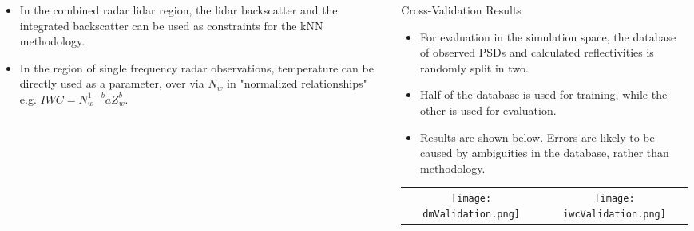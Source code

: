 \documentclass[final,t]{beamer}
\begin{document}
\begin{frame}
\begin{columns}[]
\begin{column}{.32\linewidth}
\begin{itemize}
\item
In the combined radar lidar region, the lidar backscatter and the integrated backscatter can be used
as constraints for the kNN methodology.
\item
In the region of single frequency radar observations, temperature can be directly used as a parameter,
over via $N_w$ in "normalized relationships" e.g. $IWC=N_w^{1-b}aZ_w^b$.
\end{itemize}
\end{column}




  \begin{column}{.32\linewidth}

  \begin{block}{Cross-Validation Results}
  \begin{itemize}
   \item
   For evaluation in the simulation space, the database of observed PSDs and calculated reflectivities is randomly split in two.
   \item
   Half of the database is used for training, while the other is used for evaluation.
   \item
   Results are shown below.  Errors are likely to be caused by ambiguities in the database, rather than
   methodology.
  \end{itemize}
  \end{block}
\begin{table}[ht]
\centering
\begin{tabular}{cc}
\texttt{[image: dmValidation.png]}&\texttt{[image: iwcValidation.png]}\\
\end{tabular}
\end{table}


\end{column}
\end{columns}
\end{frame}
\end{document}
